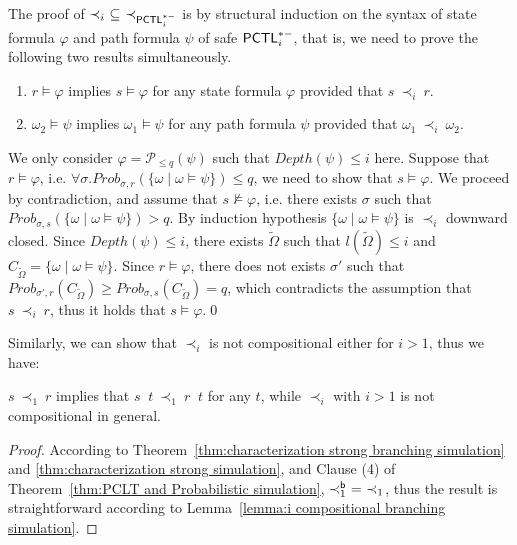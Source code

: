 \documentclass{LMCS}
\def\phi{\varphi}
\DeclareMathOperator{\interleave}{||}
\newcommand{\PCTL}{{\sf PCTL}}
\newcommand{\iSi}[1]{\prec_{#1}}
\newcommand{\iBSi}[1]{\prec_{#1}^{{\sf b}}}
\newcommand{\iSEPCTLSM}[1]{\prec_{\PCTL_{#1}^{*-}}}
\newcommand{\PAR}[2]{#1\interleave#2}
\newcommand{\MC}[1]{\mathcal{#1}}
\newcommand{\DEPTH}{\mathit{Depth}}
\newcommand{\MEASURE}{\mathit{Prob}}
\begin{document}
The proof of $\iSi{i}~\subseteq~\iSEPCTLSM{i}$ is by structural induction on the syntax of state formula $\phi$ and path formula $\psi$ of safe $\PCTL^{*-}_i$, that is, we need to prove the following two results simultaneously.
\begin{enumerate}[(1)]
\item $r\models\phi$ implies $s\models\phi$ for any state formula $\phi$ provided that $s~\iSi{i}~r$.
\item $\omega_2\models\psi$ implies $\omega_1\models\psi$ for any path formula $\psi$ provided that $\omega_1~\iSi{i}~\omega_2$.
\end{enumerate}

We only consider $\phi=\MC{P}_{\leq q}(\psi)$ such that $\DEPTH(\psi)\leq i$ here. Suppose that 
$r\models\phi$, i.e. $\forall\sigma.\MEASURE_{\sigma,r}(\{\omega\mid\omega\models\psi\})\leq
q$, we need to show that $s\models\phi$. We proceed by contradiction, and assume that 
$s\not\models\phi$, i.e. there exists $\sigma$ such that 
$\MEASURE_{\sigma,s}(\{\omega\mid\omega\models\psi\})>q$. 
By induction hypothesis $\{\omega\mid\omega\models\psi\}$ is $\iSi{i}$ 
downward closed. Since $\DEPTH(\psi)\leq i$, there exists 
$\widetilde{\Omega}$ such that $l(\widetilde{\Omega})\leq i$ and 
$C_{\widetilde{\Omega}}= \{\omega\mid\omega\models\psi\}$.  
Since $r\models\phi$, there does not exists $\sigma'$ such that 
$\MEASURE_{\sigma',r}(C_{\widetilde{\Omega}})\geq\MEASURE_{\sigma,s}(C_{\widetilde{\Omega}})=q$, which 
contradicts the assumption that $s~\iSi{i}~r$, thus it holds that $s\models\phi$.\qed


Similarly, we can show that $\iSi{i}$ is not compositional either for
$i>1$, thus we have:
\begin{lem}\label{lemma:i compositional simulation}
$s~\iSi{1}~r$ implies that $\PAR{s}{t}~\iSi{1}~\PAR{r}{t}$ for any $t$, while $\iSi{i}$ with $i>1$ is not compositional in general.
\end{lem}
\begin{proof}
According to Theorem~\ref{thm:characterization strong branching simulation} and \ref{thm:characterization strong simulation}, and Clause (4) of Theorem~\ref{thm:PCLT and Probabilistic simulation}, $\iBSi{1}~=~\iSi{1}$, thus the result is straightforward according to Lemma~\ref{lemma:i compositional branching simulation}.
\end{proof}
\end{document}
